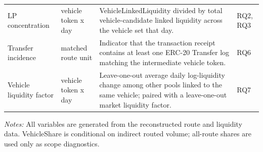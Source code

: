 \documentclass[12pt]{article}
\begin{document}
\begin{landscape}
\begin{table}[!htbp]
\begin{threeparttable}
\begin{tabular}{@{}>{\raggedright\arraybackslash}p{}>{\raggedright\arraybackslash}p{}>{\raggedright\arraybackslash}p{}>{\raggedright\arraybackslash}p{}@{}}
LP concentration & vehicle token x day & VehicleLinkedLiquidity divided by total vehicle-candidate linked liquidity across the vehicle set that day. & RQ2, RQ3 \\
Transfer incidence & matched route unit & Indicator that the transaction receipt contains at least one ERC-20 Transfer log matching the intermediate vehicle token. & RQ6 \\
Vehicle liquidity factor & vehicle token x day & Leave-one-out average daily log-liquidity change among other pools linked to the same vehicle; paired with a leave-one-out market liquidity factor. & RQ7 \\
\bottomrule
\end{tabular}
\begin{tablenotes}[flushleft]
\footnotesize
\item \textit{Notes:} All variables are generated from the reconstructed route and liquidity data. VehicleShare is conditional on indirect routed volume; all-route shares are used only as scope diagnostics.
\end{tablenotes}
\end{threeparttable}
\end{table}
\end{landscape}
\end{document}
